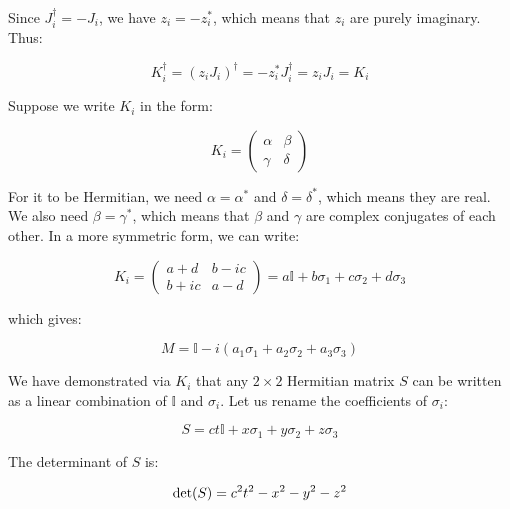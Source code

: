 \documentclass[12pt]{article}
\begin{document}
Since $J_{i}^{\dagger} = -J_{i}$, we have $z_{i} = -z_{i}^{*}$, which means that $z_{i}$ are purely imaginary. Thus:

\begin{equation}
    K_{i}^{\dagger} = (z_{i}J_{i})^{\dagger} = -z_{i}^{*}J_{i}^{\dagger} = z_{i}J_{i} = K_{i}
\end{equation}

Suppose we write $K_{i}$ in the form:

\begin{equation}
    K_{i} =
    \begin{pmatrix}
        \alpha & \beta  \\
        \gamma & \delta
    \end{pmatrix}
\end{equation}

For it to be Hermitian, we need $\alpha = \alpha^{*}$ and $\delta = \delta^{*}$, which means they are real. We also need $\beta = \gamma^{*}$, which means that $\beta$ and $\gamma$ are complex conjugates of each other. In a more symmetric form, we can write:

\begin{equation}
    K_{i} =
    \begin{pmatrix}
        a + d  & b - ic \\
        b + ic & a - d
    \end{pmatrix}
    =
    a\mathbb{I} + b\sigma_{1} + c\sigma_{2} + d\sigma_{3}
\end{equation}

which gives:

\begin{equation}
    M = \mathbb{I} - i(a_{1} \sigma_{1} + a_{2} \sigma_{2} + a_{3} \sigma_{3})
\end{equation}

We have demonstrated via $K_{i}$ that any $2 \times 2$ Hermitian matrix $S$ can be written as a linear combination of $\mathbb{I}$ and $\sigma_{i}$. Let us rename the coefficients of $\sigma_{i}$:

\begin{equation}
    S = ct\mathbb{I} + x\sigma_{1} + y\sigma_{2} + z\sigma_{3}
\end{equation}

The determinant of $S$ is:

\begin{equation}
    \det(S) = c^{2}t^{2} - x^{2} - y^{2} - z^{2} \\
\end{equation}
\end{document}
